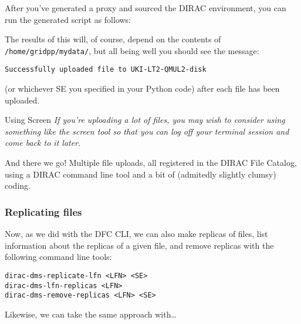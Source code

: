 After you've generated a proxy and sourced the DIRAC environment, you
can run the generated script as follows:

\begin{Shaded}
\begin{Highlighting}[]
\NormalTok{$ } 
\NormalTok{$ } 
\NormalTok{$ } 
\end{Highlighting}
\end{Shaded}

The results of this will, of course, depend on the contents of
\texttt{/home/gridpp/mydata/}, but all being well you should see the
message:

\begin{verbatim}
Successfully uploaded file to UKI-LT2-QMUL2-disk
\end{verbatim}

(or whichever SE you specified in your Python code) after each file has
been uploaded.

\begin{infobox}{Using Screen}
\emph{If you're uploading a lot of files, you may wish to consider using
something like the screen tool so that you can log off your terminal
session and come back to it later.}
\end{infobox}

And there we go! Multiple file uploads, all registered in the DIRAC File
Catalog, using a DIRAC command line tool and a bit of (admitedly
slightly clumsy) coding.

\subsubsection{Replicating files}
\label{replicating-files-tools}
Now, as we did with the DFC CLI, we can also make replicas of files,
list information about the replicas of a given file, and remove replicas
with the following command line tools:

\begin{verbatim}
dirac-dms-replicate-lfn <LFN> <SE>
dirac-dms-lfn-replicas <LFN>
dirac-dms-remove-replicas <LFN> <SE>
\end{verbatim}

Likewise, we can take the same approach with\ldots{}

